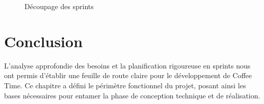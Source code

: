 \begin{figure}[H]
\caption{Découpage des sprints}
\label{fig:decoupage_sprints}
\end{figure}

\section{Conclusion}
L'analyse approfondie des besoins et la planification rigoureuse en sprints nous ont permis
d'établir une feuille de route claire pour le développement de Coffee Time. Ce chapitre a
défini le périmètre fonctionnel du projet, posant ainsi les bases nécessaires pour entamer
la phase de conception technique et de réalisation.

